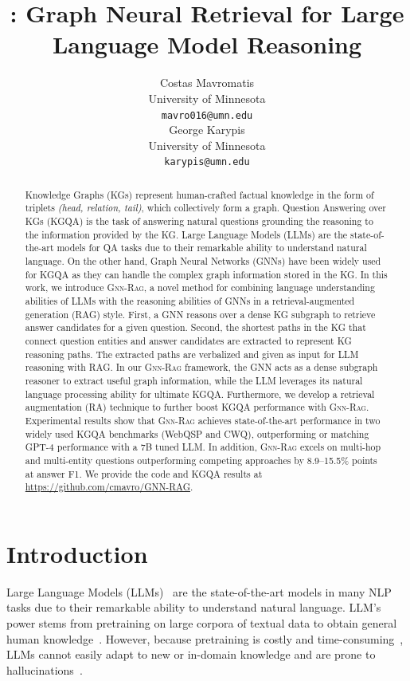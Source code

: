 \documentclass{article}
\title{\grag: Graph Neural  Retrieval for Large Language Model Reasoning}
\author{%
  Costas Mavromatis \\
  University of Minnesota\\
  \texttt{mavro016@umn.edu} \\
  \And
  George Karypis \\
  University of Minnesota\\
  \texttt{karypis@umn.edu} \\
}
\newcommand{\grag}{\textsc{Gnn-Rag}\xspace}
\theoremstyle{plain}
\theoremstyle{definition}
\theoremstyle{remark}
\begin{document}
\maketitle


\begin{abstract}
  Knowledge Graphs (KGs) represent human-crafted factual knowledge in the form of triplets \textit{(head, relation, tail)}, which collectively form a graph. Question Answering over KGs (KGQA) is the task  of answering natural questions grounding the reasoning to the information provided by the KG. Large Language Models (LLMs) are the state-of-the-art models for QA tasks due to their remarkable ability to understand natural language. On the other hand, Graph Neural Networks (GNNs) have been widely used for KGQA as they can handle the complex graph information stored in the KG. In this work, we introduce \textsc{Gnn-Rag}, a novel method for combining language understanding abilities of LLMs with the reasoning abilities of GNNs in a retrieval-augmented generation (RAG) style. First, a GNN reasons over a dense KG subgraph to retrieve answer candidates for a given question. Second, the shortest paths in the KG  that connect question entities and answer candidates are extracted to represent KG reasoning paths. The extracted paths are verbalized and given as input for LLM reasoning with RAG. In our \textsc{Gnn-Rag} framework, the GNN acts as a dense subgraph reasoner to extract useful graph information, while the LLM leverages its natural language processing ability for ultimate KGQA. Furthermore, we develop a retrieval augmentation (RA) technique to further boost KGQA performance with \grag. Experimental results show that \textsc{Gnn-Rag} achieves state-of-the-art performance in two widely used KGQA benchmarks (WebQSP and CWQ), outperforming or matching GPT-4 performance with a 7B tuned LLM. In addition, \textsc{Gnn-Rag} excels on multi-hop and multi-entity questions outperforming competing approaches by 8.9--15.5\% points at answer F1. 
We provide the code and KGQA results at \url{https://github.com/cmavro/GNN-RAG}.
  
\end{abstract}

\section{Introduction}



Large Language Models (LLMs)~\citep{brown2020language,bommasani2021opportunities,chowdhery2023palm} are the state-of-the-art models in many NLP tasks due to their remarkable ability to understand natural language. LLM's power stems from pretraining on large corpora of textual data to obtain general human knowledge~\citep{kaplan2020scaling,hoffmann2022training}. However, because pretraining is costly and time-consuming~\citep{gururangan2020don}, LLMs cannot easily adapt to new or in-domain knowledge and are prone to hallucinations~\citep{zhang2023siren}. 
\end{document}
